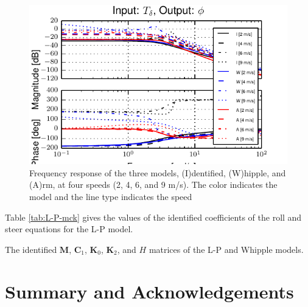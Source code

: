 \documentclass[a4paper]{article}
\begin{document}
\begin{figure}
  \label{fig:L-P-Tdel-Phi}
  \includegraphics[width=5in]{figures/L-P-Tdel-Phi.pdf}
  \caption{Frequency response of the three models, (I)dentified, (W)hipple, and
    (A)rm, at four speeds (2, 4, 6, and 9 m/s). The color indicates the model
    and the line type indicates the speed}
\end{figure}

Table \ref{tab:L-P-mck} gives the values of the identified coefficients of the
roll and steer equations for the L-P model.

\begin{table}
  \label{tab:L-P-mck}
  \caption{The identified $\mathbf{M}$, $\mathbf{C}_1$, $\mathbf{K}_0$,
  $\mathbf{K}_2$, and $H$ matrices of the L-P and Whipple
  models.}
  
\end{table}

\section{Summary and Acknowledgements}
\end{document}
